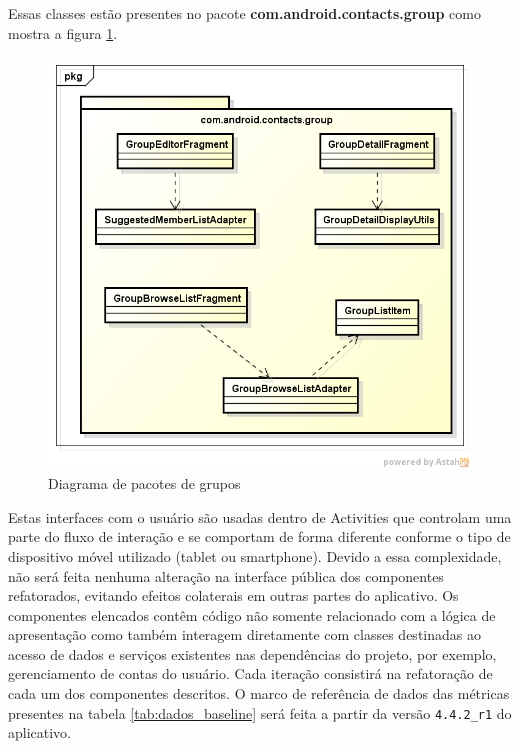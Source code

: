 \documentclass[conference]{IEEEtran}
\begin{document}
Essas classes estão presentes no pacote \textbf{com.android.contacts.group} como
mostra a figura \ref{fig:classes_group_baseline}.

\begin{figure}[htb]
	\begin{center}
		\includegraphics[scale=0.5]{img/classes_group_baseline.png}
	\end{center}
	\caption{\label{fig:classes_group_baseline} Diagrama de pacotes de grupos}   
	
\end{figure}

Estas interfaces com o usuário são usadas dentro de Activities que controlam uma
parte do fluxo de interação e se comportam de forma diferente conforme o tipo de dispositivo
móvel utilizado (tablet ou smartphone). Devido a essa complexidade, não será
feita nenhuma alteração na interface pública dos componentes refatorados, evitando efeitos colaterais em
outras partes do aplicativo. Os componentes elencados contêm código não somente
relacionado com a lógica de apresentação como também interagem diretamente com classes destinadas ao acesso
de dados e serviços existentes nas dependências do projeto, por exemplo,
gerenciamento de contas do usuário.  Cada iteração consistirá na refatoração de
cada um dos componentes descritos. O marco de referência de dados das métricas presentes na tabela \ref{tab:dados_baseline} será feita a partir da
versão \verb|4.4.2_r1| do aplicativo.
\end{document}
